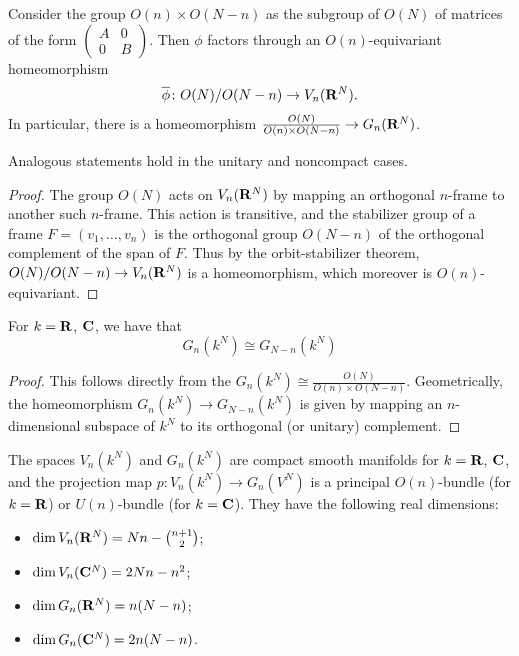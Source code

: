 \documentclass[a4paper,openany]{scrbook}
\begin{document}
\begin{lemma}\label{lemma:grassstiefelashomogeneousspaces}
Consider the group $O(n) \times O(N-n)$ as the subgroup of $O(N)$ of matrices of the form $\left(\begin{smallmatrix} A & 0\\ 0 & B\end{smallmatrix}\right)$. Then $\phi$ factors through an $O(n)$-equivariant homeomorphism
\[
\overline\phi\colon O(N)/O(N-n) \to V_n(\mathbf R^N).
\]
In particular, there is a homeomorphism $\frac{O(N)}{O(n)\times O(N-n)} \to G_n(\mathbf R^N)$.

Analogous statements hold in the unitary and noncompact cases.
\end{lemma}
\begin{proof}
The group $O(N)$ acts on $V_n(\mathbf R^N)$ by mapping an orthogonal $n$-frame to another such $n$-frame. This action is transitive, and the stabilizer group of a frame $F=(v_1,\dots,v_n)$ is the orthogonal group $O(N-n)$ of the orthogonal complement of the span of $F$. Thus by the orbit-stabilizer theorem, $O(N)/O(N-n) \to V_n(\mathbf R^N)$ is a homeomorphism, which moreover is $O(n)$-equivariant.
\end{proof}


\begin{corollary}
For $k=\mathbf R$, $\mathbf C$, we have that
\[
G_n(k^N) \cong G_{N-n}(k^N)
\]
\end{corollary}
\begin{proof}
This follows directly from the $G_n(k^N) \cong \frac{O(N)}{O(n) \times O(N-n)}$. Geometrically, the homeomorphism $G_n(k^N) \to G_{N-n}(k^N)$ is given by mapping an $n$-dimensional subspace of $k^N$ to its orthogonal (or unitary) complement.
\end{proof}



\begin{corollary} \label{cor:stiefelgrassmannbundle}\label{thm:grassmannianmanifolds}
The spaces $V_n(k^N)$ and $G_n(k^N)$ are compact smooth manifolds for $k=\mathbf R$, $\mathbf C$, and the projection map $p\colon V_n(k^N) \to G_n(V^N)$ is a principal $O(n)$-bundle (for $k=\mathbf R$) or $U(n)$-bundle (for $k=\mathbf C$). They have the following real dimensions:
\begin{itemize}
\item $\dim V_n(\mathbf R^N) = Nn - {n+1 \choose 2}$;
\item $\dim V_n(\mathbf C^N) = 2Nn - n^2$;
\item $\dim G_n(\mathbf R^N) = n(N-n)$;
\item $\dim G_n(\mathbf C^N) = 2n(N-n)$.
\end{itemize}
\end{corollary}
\end{document}
